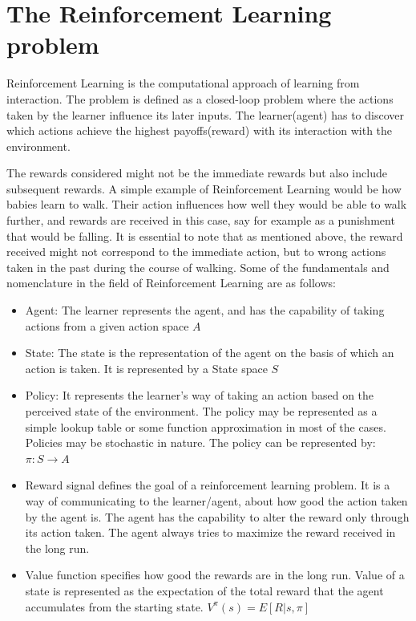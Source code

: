 \documentclass[hidelinks,BTech]{iitmdiss}
\begin{document}
\section {The Reinforcement Learning problem}
Reinforcement Learning is the computational approach of learning from interaction. The problem is defined as a closed-loop problem where the actions taken by the learner influence its later inputs. The learner(agent) has to discover which actions achieve the highest payoffs(reward) with its interaction with the environment. 

The rewards considered might not be the immediate rewards but also include subsequent rewards. A simple example of Reinforcement Learning would be how babies learn to walk. Their action influences how well they would be able to walk further, and rewards are received in this case, say for example as a punishment that would be falling. It is essential to note that as mentioned above, the reward received might not correspond to the immediate action, but to wrong actions taken in the past during the course of walking. Some of the fundamentals and nomenclature in the field of Reinforcement Learning are as follows:
\begin{itemize}
\item{Agent: The learner represents the agent, and has the capability of taking actions from a given action space $A$}
\item{State: The state is the representation of the agent on the basis of which an action is taken. It is represented by a State space $S$}
\item{Policy: It represents the learner's way of taking an action based on the perceived state of the environment. The policy may be represented as a simple lookup table or some function approximation in most of the cases. Policies may be stochastic in nature.
The policy can be represented by: $\pi: S\rightarrow A$}

\item{Reward signal defines the goal of a reinforcement learning problem. It is a way of communicating to the learner/agent, about how good the action taken by the agent is. The agent has the capability to alter the reward only through its action taken. The agent always tries to maximize the reward received in the long run.}
\item{Value function specifies how good the rewards are in the long run. Value of a state is represented as the expectation of the total reward that the agent accumulates from the starting state.  $V^{\pi} (s) = E[R|s,\pi]$}
\end{itemize}
\end{document}
